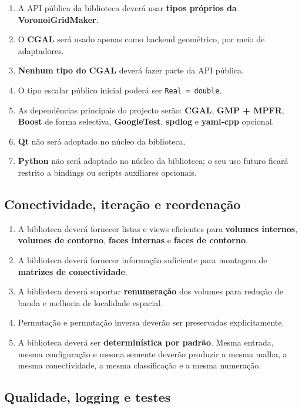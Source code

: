 \begin{enumerate}
    \item A API pública da biblioteca deverá usar \textbf{tipos próprios da VoronoiGridMaker}.
    \item O \textbf{CGAL} será usado apenas como backend geométrico, por meio de adaptadores.
    \item \textbf{Nenhum tipo do CGAL} deverá fazer parte da API pública.
    \item O tipo escalar público inicial poderá ser \texttt{Real = double}.
    \item As dependências principais do projecto serão: \textbf{CGAL}, \textbf{GMP + MPFR}, \textbf{Boost} de forma selectiva, \textbf{GoogleTest}, \textbf{spdlog} e \textbf{yaml-cpp} opcional.
    \item \textbf{Qt} não será adoptado no núcleo da biblioteca.
    \item \textbf{Python} não será adoptado no núcleo da biblioteca; o seu uso futuro ficará restrito a bindings ou scripts auxiliares opcionais.
\end{enumerate}

\subsection{Conectividade, iteração e reordenação}

\begin{enumerate}
    \item A biblioteca deverá fornecer listas e views eficientes para \textbf{volumes internos}, \textbf{volumes de contorno}, \textbf{faces internas} e \textbf{faces de contorno}.
    \item A biblioteca deverá fornecer informação suficiente para montagem de \textbf{matrizes de conectividade}.
    \item A biblioteca deverá suportar \textbf{renumeração} dos volumes para redução de banda e melhoria de localidade espacial.
    \item Permutação e permutação inversa deverão ser preservadas explicitamente.
    \item A biblioteca deverá ser \textbf{determinística por padrão}. Mesma entrada, mesma configuração e mesma semente deverão produzir a mesma malha, a mesma conectividade, a mesma classificação e a mesma numeração.
\end{enumerate}

\subsection{Qualidade, logging e testes}

